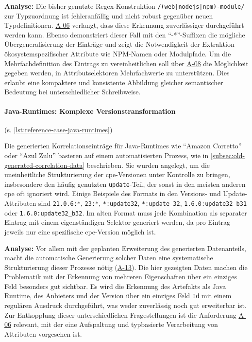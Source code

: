 \textbf{Analyse:}
Die bisher genutzte Regex-Konstruktion \texttt{/(web|nodejs|npm)-module/} zur Typzuordnung ist fehleranfällig und nicht robust gegenüber neuen Typdefinitionen.
\hyperref[subsec:req-type-specific-matching]{A-06} verlangt, dass diese Erkennung zuverlässiger durchgeführt werden kann.
Ebenso demonstriert dieser Fall mit den \enquote{-*}-Suffixen die mögliche Übergeneralisierung der Einträge und zeigt die Notwendigkeit der Extraktion ökosystemspezifischer Attribute wie NPM-Namen oder Modulpfade.
Um die Mehrfachdefinition des Eintrags zu vereinheitlichen soll über \hyperref[subsec:req-multiple-attribute-values]{A-08} die Möglichkeit gegeben werden, in Attributselektoren Mehrfachwerte zu unterstützen.
Dies erlaubt eine kompaktere und konsistente Abbildung gleicher semantischer Bedeutung bei unterschiedlicher Schreibweise.

\paragraph{Java-Runtimes: Komplexe Versionstransformation}\label{par:reference-case-java-runtimes} (s. \autoref{lst:reference-case-java-runtimes})

Die generierten Korrelationseinträge für Java-Runtimes wie \enquote{Amazon Corretto} oder \enquote{Azul Zulu} basieren auf einem automatisierten Prozess, wie in \autoref{subsec:old-generated-correlation-data} beschrieben.
Sie wurden angelegt, um die uneinheitliche Strukturierung der \acrshort{cpe}-Versionen unter Kontrolle zu bringen, insbesondere den häufig genutzten \texttt{update}-Teil, der sonst in den meisten anderen \acrshort{cpe} oft ignoriert wird.
Einige Beispiele des Formats in den Versions- und Update-Attributen sind \texttt{21.0.6:*}, \texttt{23:*}, \texttt{*:update32}, \texttt{*:update\_32}, \texttt{1.6.0:update32\_b31} oder \texttt{1.6.0:update32\_b32}.
Im alten Format muss jede Kombination als separater Eintrag mit einem eigenständigen Selektor generiert werden, da pro Eintrag jeweils nur eine spezifische \acrshort{cpe}-Version möglich ist.

\textbf{Analyse:}
Vor allem mit der geplanten Erweiterung des generierten Datenanteils, macht die automatische Generierung solcher Daten eine systematische Strukturierung dieser Prozesse nötig (\hyperref[subsec:req-generated-data]{A-13}).
Die hier gezeigten Daten machen die Problematik mit der Erkennung von mehreren Eigenschaften über ein einziges Feld besonders gut sichtbar.
Es wird die Erkennung des Artefakts als Java Runtime, des Anbieters und der Version über ein einziges Feld \texttt{Id} mit einem regulären Ausdruck durchgeführt, was weder zuverlässig noch gut erweiterbar ist.
Zur Entkopplung dieser unterschiedlichen Fragestellungen ist die Anforderung \hyperref[subsec:req-type-specific-matching]{A-06} relevant, mit der eine Aufspaltung und typbasierte Verarbeitung von Attributen vorgesehen ist.

